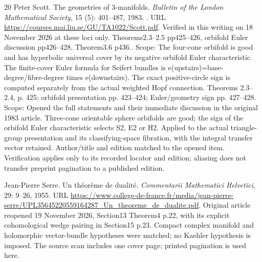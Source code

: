 \documentclass[11pt,a4paper]{article}
\theoremstyle{definition}
\begin{document}
\begin{thebibliography}{20}
Peter Scott.
\newblock The geometries of 3-manifolds.
\newblock \emph{Bulletin of the London Mathematical Society}, 15
  (5): 401--487, 1983.
\newblock {}.
\newblock URL \url{https://courses.mai.liu.se/GU/TA1022/Scott.pdf}.
\newblock Verified in this writing on 18 November 2026 at these loci only.
  Theorems2.3–2.5 pp425–426, orbifold Euler discussion pp426–428,
  Theorem3.6 p436.. Scope: The four-cone orbifold is good and has hyperbolic
  universal cover by its negative orbifold Euler characteristic. The
  finite-cover Euler formula for Seifert bundles is
  e(upstairs)=base-degree/fibre-degree times e(downstairs). The exact
  positive-circle sign is computed separately from the actual weighted Hopf
  connection. Theorems 2.3–2.4, p. 425;\allowbreak{} orbifold presentation pp. 423–424;\allowbreak{}
  Euler/geometry sign pp. 427–428. Scope: Opened the full statements and
  their immediate discussion in the original 1983 article. Three-cone
  orientable sphere orbifolds are good;\allowbreak{} the sign of the orbifold Euler
  characteristic selects S2, E2 or H2. Applied to the actual triangle-group
  presentation and its classifying-space fibration, with the integral transfer
  vector retained. Author/title and edition matched to the opened item.
  Verification applies only to its recorded locator and edition;\allowbreak{} aliasing does
  not transfer preprint pagination to a published edition.

Jean-Pierre Serre.
\newblock Un th{\'e}or{\`e}me de dualit{\'e}.
\newblock \emph{Commentarii Mathematici Helvetici}, 29: 9--26, 1955.
\newblock URL
  \url{https://www.college-de-france.fr/media/jean-pierre-serre/UPL35645220559164287_Un_theoreme_de_dualite.pdf}.
\newblock Original article reopened 19 November 2026, Section13 Theorem4 p.22,
  with its explicit cohomological wedge pairing in Section15 p.23. Compact
  complex manifold and holomorphic vector-bundle hypotheses were matched;\allowbreak{} no
  Kaehler hypothesis is imposed. The source scan includes one cover page;\allowbreak{}
  printed pagination is used here.


\end{thebibliography}
\end{document}
